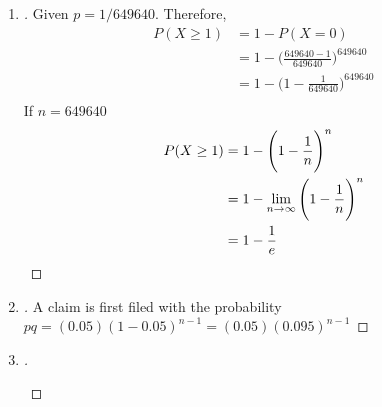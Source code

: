 \documentclass[paper=usletter, fontsize=12pt]{article}
\begin{document}
\begin{enumerate}
        \item
        \begin{proof}[\unskip\nopunct]
            Given $p = 1/649640$.
            Therefore,
            \begingroup
            \addtolength{\jot}{1em}
            \begin{align*}
                P(X \ge 1) & = 1 - P(X = 0)\\
                & = 1 - \Bigg(\frac{649640-1}{649640}\Bigg)^{649640}\\
                & = 1 - \Bigg(1 - \frac{1}{649640}\Bigg)^{649640}\\
            \end{align*}
            If $n = 649640$
            \begin{align*}
                P(X \ge 1) & = 1 - \Bigg(1 - \frac{1}{n}\Bigg)^{n}\\
                & = 1 - \lim_{n \rightarrow \infty}\Bigg(1 -
                \frac{1}{n}\Bigg)^{n}\\
                & = 1 - \frac{1}{e} \qedhere
            \end{align*}
            \endgroup
        \end{proof}
        \vspace{0.2in}

        \item
        \begin{proof}[\unskip\nopunct]
            A claim is first filed with the probability\\
            $pq = (0.05)(1 - 0.05)^{n-1}=(0.05)(0.095)^{n-1}$
        \end{proof}
        \vspace{0.2in}

        \item
        \begin{proof}[\unskip\nopunct]

            \begin{enumerate}


\end{enumerate}
\end{proof}
\end{enumerate}
\end{document}
